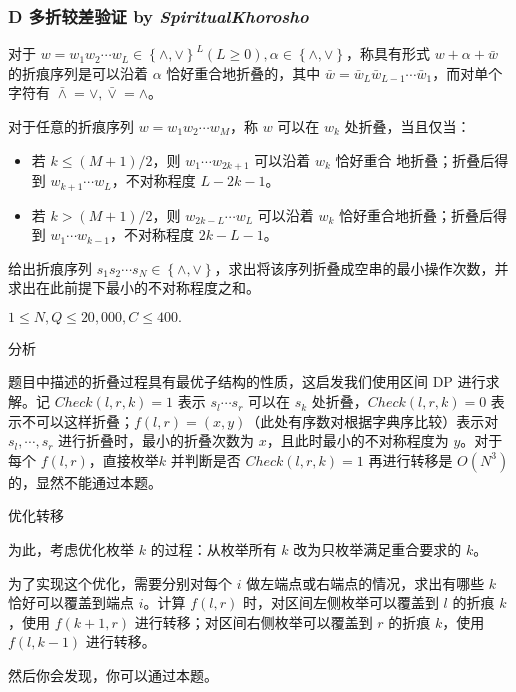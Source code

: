 \frame
{
  \frametitle{D 多折较差验证 {by \itshape SpiritualKhorosho}}

  	对于 $w=w_1 w_2 \cdots w_L \in \left\{\land, \lor\right\}^L (L\ge 0), \alpha \in \left\{\land, \lor\right\}$，称具有形式 $w + \alpha + \bar{w}$ 的折痕序列是可以沿着 $\alpha$ 恰好重合地折叠的，其中
	$\bar{w} = \bar{w}_L \bar{w}_{L-1} \cdots \bar{w}_1$，而对单个字符有 $\bar{\land} = \lor, \bar{\lor} = \land$。

	对于任意的折痕序列 $w = w_1 w_2 \cdots w_M$，称 $w$ 可以在 $w_k$ 处折叠，当且仅当：
	\begin{itemize}
		\item 若 $k\le (M+1)/2$，则 $w_1 \cdots w_{2k+1}$ 可以沿着 $w_k$ 恰好重合 地折叠；折叠后得到 $w_{k+1} \cdots w_L$，不对称程度 $L - 2k - 1$。
		\item 若 $k> (M+1)/2$，则 $w_{2k-L} \cdots w_L$ 可以沿着 $w_k$ 恰好重合地折叠；折叠后得到 $w_1 \cdots w_{k-1}$，不对称程度 $2k-L-1$。
	\end{itemize}

	给出折痕序列 $s_1 s_2 \cdots s_N \in \left\{\land, \lor\right\}$，求出将该序列折叠成空串的最小操作次数，并求出在此前提下最小的不对称程度之和。

	$1\le N, Q\le 20,000, C\le 400.$
}

\begin{frame}{分析}
	
	题目中描述的折叠过程具有最优子结构的性质，这启发我们使用区间 DP 进行求解。记 $Check(l, r, k) = 1$ 表示 $s_l \cdots s_r$ 可以在 $s_k$ 处折叠，$Check(l, r, k) = 0$ 表示不可以这样折叠；$f(l,r) =(x,y)$（此处有序数对根据字典序比较）表示对 $s_l, \cdots, s_r$ 进行折叠时，最小的折叠次数为 $x$，且此时最小的不对称程度为 $y$。对于每个 $f(l,r)$，直接枚举$k$ 并判断是否 $Check(l,r,k)=1$ 再进行转移是 $O\left(N^3\right)$ 的，显然不能通过本题。

\end{frame}

\begin{frame}{优化转移}
	
	为此，考虑优化枚举 $k$ 的过程：从枚举所有 $k$ 改为只枚举满足重合要求的 $k$。

	为了实现这个优化，需要分别对每个 $i$ 做左端点或右端点的情况，求出有哪些 $k$ 恰好可以覆盖到端点 $i$。计算 $f(l,r)$ 时，对区间左侧枚举可以覆盖到 $l$ 的折痕 $k$，使用 $f(k+1,r)$ 进行转移；对区间右侧枚举可以覆盖到 $r$ 的折痕 $k$，使用 $f(l,k-1)$ 进行转移。\pause

	然后你会发现，你可以通过本题。

\end{frame}

